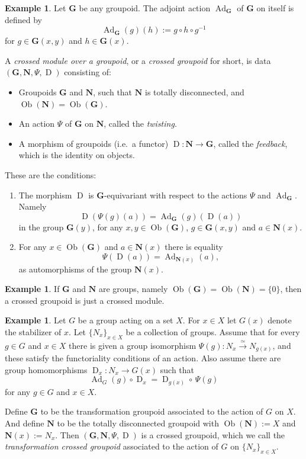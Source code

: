 \documentclass[a4paper,10pt]{amsart}
\theoremstyle{definition}
\newtheorem{exa}[equation]{Example}
\numberwithin{equation}{section}
\newcommand{\iso}{\xrightarrow{\simeq}}
\newcommand{\opn}{\operatorname}
\newcommand{\rmitem}[1]{\item[\text{\textup{(#1)}}]}
\newcommand{\bsym}[1]{\boldsymbol{#1}}
\newcommand{\lb}{\linebreak}
\begin{document}
\begin{exa}
Let $\bsym{G}$ be any groupoid. The adjoint action $\opn{Ad}_{\bsym{G}}$ of
$\bsym{G}$ on itself is defined by
\[ \opn{Ad}_{\bsym{G}}(g)(h) := g \circ h \circ g^{-1} \]
for $g \in \bsym{G}(x, y)$ and $h \in \bsym{G}(x)$.
\end{exa}

A {\em crossed module over a groupoid}, or a {\em crossed groupoid} 
for short, is data \lb
$(\bsym{G}, \bsym{N}, \Psi, \opn{D})$ consisting of:
\begin{itemize}
\item Groupoids $\bsym{G}$ and $\bsym{N}$, such that
$\bsym{N}$ is totally disconnected, and  
$\opn{Ob}(\bsym{N}) = \opn{Ob}(\bsym{G})$.

\item An action $\Psi$ of $\bsym{G}$ on $\bsym{N}$, called the {\em twisting}.

\item A morphism of groupoids (i.e.\ a functor)
$\opn{D} : \bsym{N} \to \bsym{G}$, called the {\em feedback}, which is the 
identity on objects.
\end{itemize}

These are the conditions:
\begin{enumerate}
\rmitem{i} The morphism $\opn{D}$ is $\bsym{G}$-equivariant with respect to
the actions $\Psi$ and $\opn{Ad}_{\bsym{G}}$. Namely 
\[ \opn{D}(\Psi(g)(a)) = \opn{Ad}_{\bsym{G}}(g)(\opn{D}(a)) \]
in the group $\bsym{G}(y)$, for any $x, y \in \opn{Ob}(\bsym{G})$, 
$g \in \bsym{G}(x, y)$ and $a \in \bsym{N}(x)$.

\rmitem{ii} For any $x \in \opn{Ob}(\bsym{G})$ and 
$a \in \bsym{N}(x)$ there is equality
\[ \Psi(\opn{D}(a)) = \opn{Ad}_{\bsym{N}(x)}(a) , \]
as automorphisms of the group $\bsym{N}(x)$.
\end{enumerate}

\begin{exa}
If $\bsym{G}$ and $\bsym{N}$ are groups, namely 
$\opn{Ob}(\bsym{G}) = \opn{Ob}(\bsym{N}) = \{ 0 \}$, then 
a crossed groupoid is just a crossed module.
\end{exa}

\begin{exa} \label{exa:100}
Let $G$ be a group acting on a set $X$. For $x \in X$ let $G(x)$ denote the
stabilizer of $x$. Let $\{ N_x \}_{x \in X}$ be a 
collection of groups. Assume that for every $g \in G$ and $x \in X$ there is
given a group isomorphism $\Psi(g) : N_x \iso N_{g(x)}$, and these satisfy the
functoriality conditions of an action. 
Also assume there are
group homomorphisms $\opn{D}_x : N_x \to G(x)$ such that 
\[ \opn{Ad}_{G}(g) \circ \opn{D}_x = \opn{D}_{g(x)} \circ \, \Psi(g) \]
for any $g \in G$ and $x \in X$. 

Define $\bsym{G}$ to be the transformation groupoid associated to the
action of $G$ on $X$. And define $\bsym{N}$ to be the totally
disconnected groupoid with $\opn{Ob}(\bsym{N}) := X$ and 
$\bsym{N}(x) := N_x$. Then 
$( \bsym{G}, \bsym{N}, \Psi, \opn{D})$ is a crossed
groupoid, which we call the {\em transformation crossed groupoid} associated to
the action of $G$ on $\{ N_x \}_{x \in X}$.
\end{exa}
\end{document}
